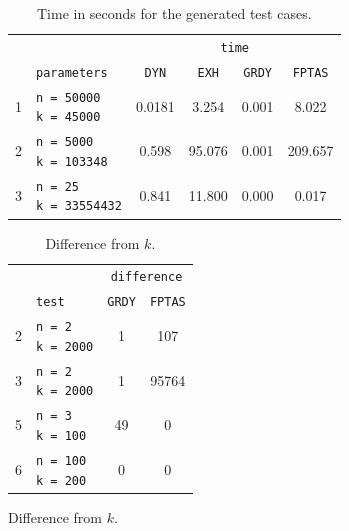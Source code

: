 \documentclass[11pt]{article}
\begin{document}
\begin{figure}[!hbpt]
    \begin{minipage}{0.6\textwidth}
        \begin{table}[H]
            \centering
            \begin{tabular}{|c|l|c|c|c|c|} \hline
                \cellcolor{blue!20} & \cellcolor{blue!20} &  \multicolumn{4}{c|}{\cellcolor{blue!20}\texttt{time}} \\ \cline{3-6} 
                \cellcolor{blue!20} & \cellcolor{blue!20}\texttt{parameters} & \texttt{DYN} & \texttt{EXH} & \texttt{GRDY} & \texttt{FPTAS} \\ \hline
                1 & \makecell[l]{ \texttt{n = 50000} \\ \texttt{k = 45000}} & 0.0181 & 3.254 & 0.001 & 8.022 \\ \hline
                2 & \makecell[l]{ \texttt{n = 5000} \\ \texttt{k = 103348}} & 0.598 & 95.076 & 0.001 & 209.657 \\ \hline
                3 & \makecell[l]{ \texttt{n = 25} \\ \texttt{k = 33554432}} & 0.841 & 11.800 & 0.000 & 0.017 \\ \hline
            \end{tabular}
            \caption{Time in seconds for the generated test cases.}
        \end{table} 
    \end{minipage}
    \begin{minipage}{0.39\textwidth}
        \begin{table}[H]
            \centering
            \begin{tabular}{|c|l|c|c|} \hline
                \cellcolor{blue!20} & \cellcolor{blue!20} & \multicolumn{2}{c|}{\cellcolor{blue!20}\texttt{difference}} \\ \cline{3-4}
                \cellcolor{blue!20} & \cellcolor{blue!20} \texttt{test} & \texttt{GRDY} & \texttt{FPTAS} \\ \hline
                2 & \makecell[l]{ \texttt{n = 2} \\ \texttt{k = 2000}} & 1 & 107 \\ \hline
                3 & \makecell[l]{ \texttt{n = 2} \\ \texttt{k = 2000}} & 1 & 95764 \\ \hline
                5 & \makecell[l]{ \texttt{n = 3} \\ \texttt{k = 100}} & 49 & 0 \\ \hline
                6 & \makecell[l]{ \texttt{n = 100} \\ \texttt{k = 200}} & 0 & 0 \\ \hline
            \end{tabular}
            \caption{Difference from $k$.}
        \end{table} 
    \end{minipage}
\end{figure}
\end{document}
